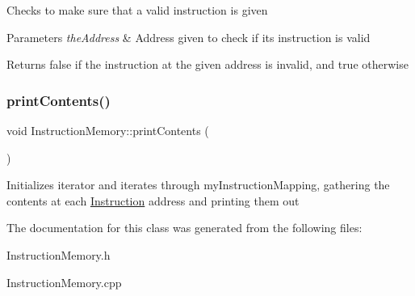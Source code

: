 Checks to make sure that a valid instruction is given 
\begin{DoxyParams}{Parameters}
{\em the\+Address} & Address given to check if it\textquotesingle{}s instruction is valid \\
\hline
\end{DoxyParams}
\begin{DoxyReturn}{Returns}
false if the instruction at the given address is invalid, and true otherwise 
\end{DoxyReturn}
\mbox{\label{class_instruction_memory_a56a478d5ce8327bf58c9d726898921f8}} 
\subsubsection{\texorpdfstring{print\+Contents()}{printContents()}}
{\footnotesize\ttfamily void Instruction\+Memory\+::print\+Contents (\begin{DoxyParamCaption}{ }\end{DoxyParamCaption})}

Initializes iterator and iterates through my\+Instruction\+Mapping, gathering the contents at each \mbox{\hyperlink{class_instruction}{Instruction}} address and printing them out 

The documentation for this class was generated from the following files\+:\begin{DoxyCompactItemize}
\item 
Instruction\+Memory.\+h\item 
Instruction\+Memory.\+cpp\end{DoxyCompactItemize}
